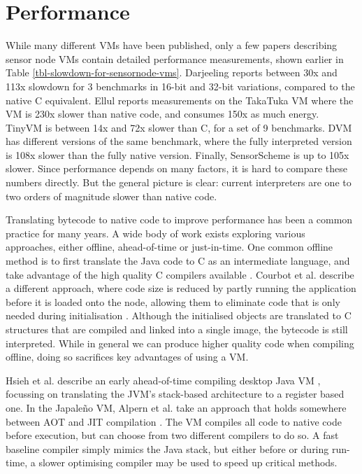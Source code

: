 \section{Performance}
While many different VMs have been published, only a few papers describing sensor node VMs contain detailed performance measurements, shown earlier in Table \ref{tbl-slowdown-for-sensornode-vms}. Darjeeling \cite{Brouwers:2009cj} reports between 30x and 113x slowdown for 3 benchmarks in 16-bit and 32-bit variations, compared to the native C equivalent. Ellul \cite{Ellul:2012thesis} reports measurements on the TakaTuka VM \cite{Aslam:2008} where the VM is 230x slower than native code, and consumes 150x as much energy. TinyVM \cite{Hong:2009gc} is between 14x and 72x slower than C, for a set of 9 benchmarks. DVM \cite{Balani:2006} has different versions of the same benchmark, where the fully interpreted version is 108x slower than the fully native version. Finally, SensorScheme \cite{Evers:2010ur} is up to 105x slower. Since performance depends on many factors, it is hard to compare these numbers directly. But the general picture is clear: current interpreters are one to two orders of magnitude slower than native code.

Translating bytecode to native code to improve performance has been a common practice for many years. A wide body of work exists exploring various approaches, either offline, ahead-of-time  or just-in-time. One common offline method is to first translate the Java code to C as an intermediate language, and take advantage of the high quality C compilers available \cite{Dean:1996wb, Muller:1997}. Courbot et al. describe a different approach, where code size is reduced by partly running the application before it is loaded onto the node, allowing them to eliminate code that is only needed during initialisation \cite{Courbot:2010}. Although the initialised objects are translated to C structures that are compiled and linked into a single image, the bytecode is still interpreted. While in general we can produce higher quality code when compiling offline, doing so sacrifices key advantages of using a VM.

Hsieh et al. describe an early ahead-of-time compiling desktop Java VM \cite{Hsieh:1996cy}, focussing on translating the JVM's stack-based architecture to a register based one. In the Japale\~no VM, Alpern et al. take an approach that holds somewhere between AOT and JIT compilation \cite{Alpern:1999}. The VM compiles all code to native code before execution, but can choose from two different compilers to do so. A fast baseline compiler simply mimics the Java stack, but either before or during run-time, a slower optimising compiler may be used to speed up critical methods.

